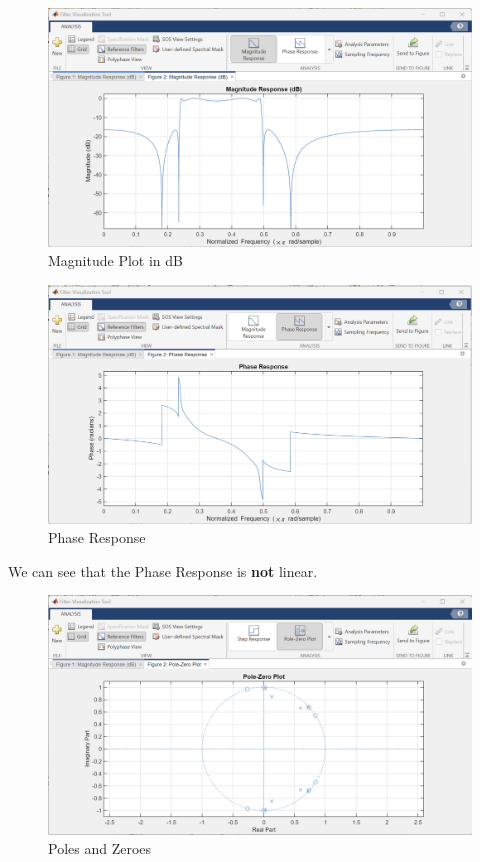 \documentclass{article}
\begin{document}
\begin{figure}[h!]

\centering
\includegraphics[scale = 0.5]{Elliptic_Magnitude_BandPass.png}
\caption{Magnitude Plot in dB}
\end{figure}

\begin{figure}[h!]

\centering
\includegraphics[scale = 0.5]{Elliptic_Phase_BandPass.png}
\caption{Phase Response}
\end{figure}

We can see that the Phase Response is \textbf{not} linear.

\begin{figure}[h!]

\centering
\includegraphics[scale = 0.5]{Elliptic_Pole_Bandpass.png}
\caption{Poles and Zeroes}
\end{figure}
\end{document}
